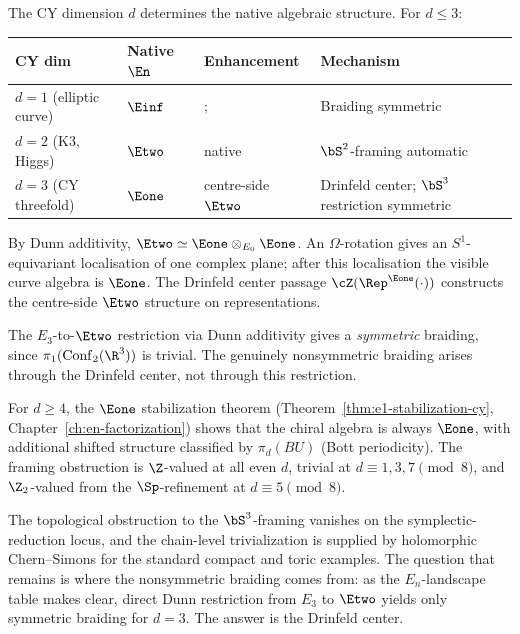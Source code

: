 \begin{remark}
\label{rem:en-landscape}
The CY dimension $d$ determines the native algebraic structure. For $d \leq 3$:
\begin{center}
\renewcommand{\arraystretch}{1.2}
\begin{tabular}{llll}
 \toprule
 \textbf{CY dim} & \textbf{Native $\En$} & \textbf{Enhancement} & \textbf{Mechanism} \\
 \midrule
 $d = 1$ (elliptic curve) & $\Einf$ &; & Braiding symmetric \\
 $d = 2$ (K3, Higgs) & $\Etwo$ & native & $\bS^2$-framing automatic \\
 $d = 3$ (CY threefold) & $\Eone$ & centre-side $\Etwo$ & Drinfeld center; $\bS^3$ restriction symmetric \\
 \bottomrule
\end{tabular}
\end{center}
By Dunn additivity, $\Etwo \simeq \Eone \otimes_{E_0} \Eone$. An $\Omega$-rotation gives an $S^1$-equivariant localisation of one complex plane; after this localisation the visible curve algebra is $\Eone$. The Drinfeld center passage $\cZ(\Rep^{\Eone}(\cdot))$ constructs the centre-side $\Etwo$ structure on representations.

The $E_3$-to-$\Etwo$ restriction via Dunn additivity gives a \emph{symmetric} braiding, since $\pi_1(\mathrm{Conf}_2(\R^3))$ is trivial. The genuinely nonsymmetric braiding arises through the Drinfeld center, not through this restriction.

For $d \geq 4$, the $\Eone$ stabilization theorem (Theorem~\ref{thm:e1-stabilization-cy}, Chapter~\ref{ch:en-factorization}) shows that the chiral algebra is always $\Eone$, with additional shifted structure classified by $\pi_d(BU)$ (Bott periodicity). The framing obstruction is $\Z$-valued at all even $d$, trivial at $d \equiv 1, 3, 7 \pmod{8}$, and $\Z_2$-valued from the $\Sp$-refinement at $d \equiv 5 \pmod{8}$.
\end{remark}

The topological obstruction to the $\bS^3$-framing vanishes on the
symplectic-reduction locus, and the chain-level trivialization is
supplied by holomorphic Chern--Simons for the standard compact and toric
examples. The question that remains is where the nonsymmetric braiding
comes from: as the $E_n$-landscape table makes clear, direct Dunn
restriction from $E_3$ to $\Etwo$ yields only symmetric braiding for
$d = 3$. The answer is the Drinfeld center.

